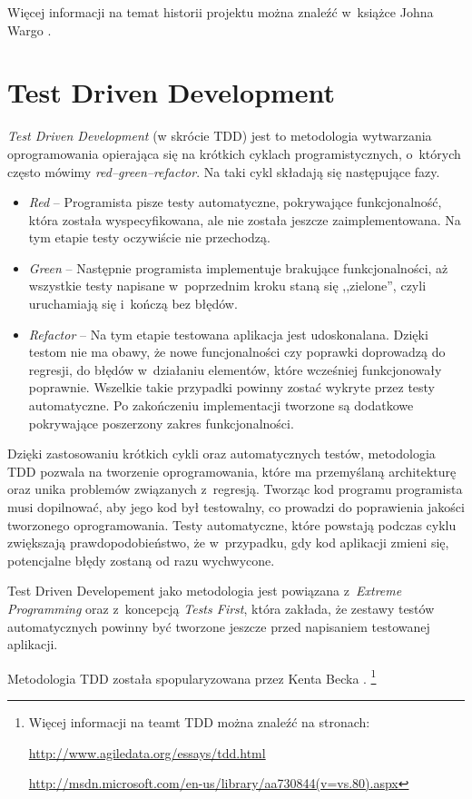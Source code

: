 \documentclass[brudnopis]{xmgr}
\begin{document}
Więcej informacji na temat historii projektu można znaleźć w~książce Johna Wargo \cite{Wargo}. 

\section{Test Driven Development}

\textit{Test Driven Development} (w skrócie TDD) jest to metodologia wytwarzania oprogramowania opierająca się na krótkich cyklach programistycznych, o~których często mówimy \textit{red--green--refactor}. Na taki cykl składają się następujące fazy.
\begin{itemize}
  \item \textit{Red} -- Programista pisze testy automatyczne, pokrywające funkcjonalność, która została wyspecyfikowana, ale nie została jeszcze zaimplementowana. Na tym etapie testy oczywiście nie przechodzą.
  \item \textit{Green} -- Następnie programista implementuje brakujące funkcjonalności, aż wszystkie testy napisane w~poprzednim kroku staną się ,,zielone'', czyli uruchamiają się i~kończą bez błędów.
  \item \textit{Refactor} -- Na tym etapie testowana aplikacja jest udoskonalana. Dzięki testom nie ma obawy, że nowe funcjonalności czy poprawki doprowadzą do regresji, do błędów w~działaniu elementów, które wcześniej funkcjonowały poprawnie. Wszelkie takie przypadki powinny zostać wykryte przez testy automatyczne. Po zakończeniu implementacji tworzone są dodatkowe pokrywające poszerzony zakres funkcjonalności.
\end{itemize}

Dzięki zastosowaniu krótkich cykli oraz automatycznych testów, metodologia TDD pozwala na tworzenie oprogramowania, które ma przemyślaną architekturę oraz unika problemów związanych z~regresją. Tworząc kod  programu programista musi dopilnować, aby jego kod był testowalny, co prowadzi do poprawienia jakości tworzonego oprogramowania. Testy automatyczne, które powstają podczas cyklu zwiększają prawdopodobieństwo, że w~przypadku, gdy kod aplikacji zmieni się, potencjalne błędy zostaną od razu wychwycone. 

Test Driven Developement jako metodologia jest powiązana z~\textit{Extreme Programming} oraz z~koncepcją \textit{Tests First}, która zakłada, że zestawy testów automatycznych powinny być tworzone jeszcze przed napisaniem testowanej aplikacji.

Metodologia TDD została spopularyzowana przez Kenta Becka \cite{Beck}.
\footnote{
Więcej informacji na teamt TDD można znaleźć na stronach:

\url{http://www.agiledata.org/essays/tdd.html}

\url{http://msdn.microsoft.com/en-us/library/aa730844(v=vs.80).aspx}
}
\end{document}
